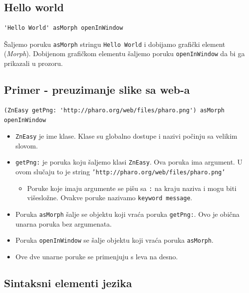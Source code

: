 \documentclass[presentation]{beamer}
\begin{document}
\subsection{Hello world}
\label{sec:org99cc0d2}

\begin{verbatim}
'Hello World' asMorph openInWindow
\end{verbatim}

Šaljemo poruku \texttt{asMorph} stringu \texttt{Hello World} i dobijamo grafički element
(\emph{Morph}). Dobijenom grafičkom elementu šaljemo poruku \texttt{openInWindow} da bi ga
prikazali u prozoru.

\subsection{Primer - preuzimanje slike sa web-a}
\label{sec:org9fbc6d6}

\begin{verbatim}
(ZnEasy getPng: 'http://pharo.org/web/files/pharo.png') asMorph openInWindow
\end{verbatim}

\begin{itemize}
\item \texttt{ZnEasy} je ime klase. Klase su globalno dostupe i nazivi počinju sa velikim
slovom.
\item \texttt{getPng:} je poruka koju šaljemo klasi \texttt{ZnEasy}. Ova poruka ima argument. U
ovom slučaju to je string \texttt{'http://pharo.org/web/files/pharo.png'}
\begin{itemize}
\item Poruke koje imaju argumente se pišu sa \texttt{:} na kraju naziva i mogu biti
višesložne. Ovakve poruke nazivamo \texttt{keyword message}.
\end{itemize}

\item Poruka \texttt{asMorph} šalje se objektu koji vraća poruka \texttt{getPng:}. Ovo je obična
unarna poruka bez argumenata.

\item Poruka \texttt{openInWindow} se šalje objektu koji vraća poruka \texttt{asMorph}.

\item Ove dve unarne poruke se primenjuju s leva na desno.
\end{itemize}

\subsection{Sintaksni elementi jezika}
\label{sec:orge2a902e}
\end{document}
